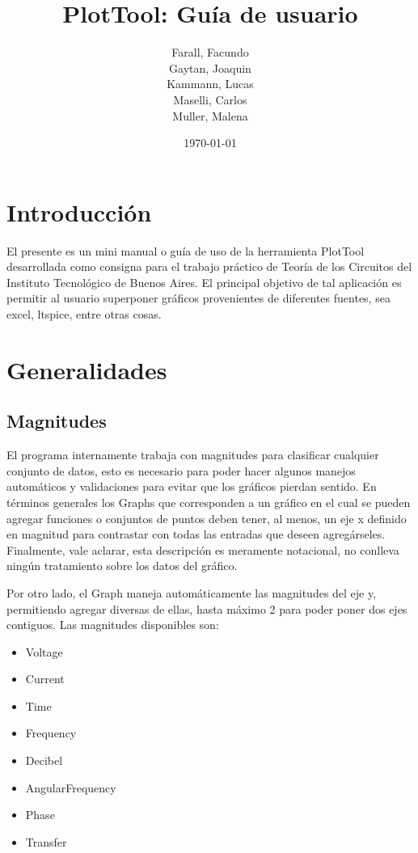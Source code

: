 \documentclass[a4paper,10pt]{article}
\begin{document}
\title{ \textbf{PlotTool: Gu\'ia de usuario} }
\author{
Farall, Facundo \\
Gaytan, Joaquin \\
Kammann, Lucas \\
Maselli, Carlos \\
Muller, Malena
}
\date{\today}

\maketitle

\section{Introducci\'on}
El presente es un mini manual o gu\'ia de uso de la herramienta PlotTool desarrollada como consigna para el trabajo
pr\'actico de Teor\'ia de los Circuitos del Instituto Tecnol\'ogico de Buenos Aires. El principal objetivo de tal aplicaci\'on es permitir al usuario superponer gr\'aficos provenientes de diferentes fuentes, sea excel, ltspice, entre otras cosas.

\section{Generalidades}

\subsection{Magnitudes}
El programa internamente trabaja con magnitudes para clasificar cualquier conjunto de datos, esto es necesario para poder hacer algunos manejos autom\'aticos y validaciones para evitar que los gr\'aficos pierdan sentido.
En t\'erminos generales los Graphs que corresponden a un gr\'afico en el cual se pueden agregar funciones o conjuntos de puntos deben tener, al menos, un eje x definido en magnitud para contrastar con todas las entradas que deseen agreg\'arseles. Finalmente, vale aclarar, esta descripci\'on es meramente notacional, no conlleva ning\'un tratamiento sobre los datos del gr\'afico.

Por otro lado, el Graph maneja autom\'aticamente las magnitudes del eje y, permitiendo agregar diversas de ellas, hasta m\'aximo 2 para poder poner dos ejes contiguos. Las magnitudes disponibles son:
\begin{center}
\begin{itemize}
	\item Voltage
    \item Current
    \item Time
    \item Frequency 
    \item Decibel
    \item AngularFrequency 
    \item Phase
    \item Transfer 
\end{itemize}
\end{center}
\end{document}
